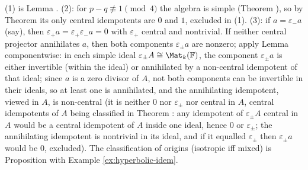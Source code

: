 (1) is Lemma . (2): for $p - q \not\equiv 1 \pmod 4$ the algebra is simple (Theorem ), so by Theorem  its only central idempotents are $0$ and $1$, excluded in (1). (3): if $a = \varepsilon_- a$ (say), then $\varepsilon_+ a = \varepsilon_+ \varepsilon_- a = 0$ with $\varepsilon_+$ central and nontrivial. If neither central projector annihilates $a$, then both components $\varepsilon_\pm a$ are nonzero; apply Lemma  componentwise: in each simple ideal $\varepsilon_\pm A \cong \Mat_k(\mathbb{F})$, the component $\varepsilon_\pm a$ is either invertible (within the ideal) or annihilated by a non-central idempotent of that ideal; since $a$ is a zero divisor of $A$, not both components can be invertible in their ideals, so at least one is annihilated, and the annihilating idempotent, viewed in $A$, is non-central (it is neither $0$ nor $\varepsilon_\pm$ nor central in $A$, central idempotents of $A$ being classified in Theorem : any idempotent of $\varepsilon_\pm A$ central in $A$ would be a central idempotent of $A$ inside one ideal, hence $0$ or $\varepsilon_\pm$; the annihilating idempotent is nontrivial in its ideal, and if it equalled $\varepsilon_\pm$ then $\varepsilon_\pm a$ would be $0$, excluded). The classification of origins (isotropic iff mixed) is Proposition  with Example \ref{ex:hyperbolic-idem}.
